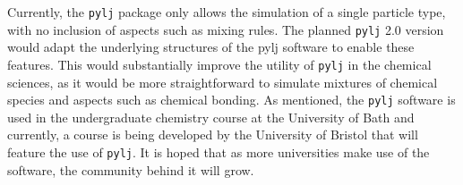 Currently, the \texttt{pylj} package only allows the simulation of a single particle type, with no inclusion of aspects such as mixing rules.
The planned \texttt{pylj} 2.0 version would adapt the underlying structures of the pylj software to enable these features.
This would substantially improve the utility of \texttt{pylj} in the chemical sciences, as it would be more straightforward to simulate mixtures of chemical species and aspects such as chemical bonding.
As mentioned, the \texttt{pylj} software is used in the undergraduate chemistry course at the University of Bath and currently, a course is being developed by the University of Bristol that will feature the use of \texttt{pylj}.
It is hoped that as more universities make use of the software, the community behind it will grow.
